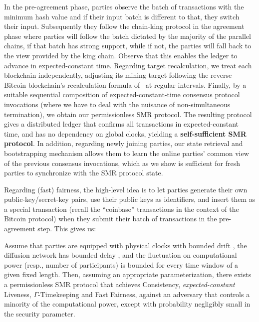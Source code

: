 In the pre-agreement phase, parties observe the batch of transactions with the minimum hash value and if their input batch is different to that, they switch their input.
%
Subsequently they follow the chain-king protocol in the agreement phase where parties will follow the batch dictated by the majority of the parallel chains, if that batch has strong support, while if not, the parties will fall back to the view provided by the king chain.
%
Observe that this enables the ledger to advance in expected-constant time.
%
Regarding target recalculation, we treat each blockchain independently, adjusting its mining target following the reverse Bitcoin blockchain's recalculation formula of~\cite{TCC:GarKiaShe22} at regular intervals.
%
Finally, by a suitable sequential composition of expected-constant-time consensus protocol invocations (where we have to deal with the nuisance of non-simultaneous termination), we obtain our permissionless SMR protocol.
%
The resulting protocol gives a distributed ledger that confirms all transactions in expected-constant time, and has no dependency on global clocks, yielding a \textbf{self-sufficient SMR protocol}.
%
In addition, regarding newly joining parties, our state retrieval and bootstrapping mechanism allows them to learn the online parties' common view of the previous consensus invocations, which as we show is sufficient for fresh parties to synchronize with the SMR protocol state.

Regarding (fast) fairness, the high-level idea is to let parties generate their own public-key/secret-key pairs, use their public keys as identifiers, and insert them as a special transaction (recall the ``coinbase'' transactions in the context of the Bitcoin protocol) when they submit their batch of transactions in the pre-agreement step.
%
This gives us:

\begin{theorem}[Informal] \label{thm:state-machine-replication}
    Assume that parties are equipped with physical clocks with bounded drift \clockDrift, the diffusion network has bounded delay \delay, and the fluctuation on computational power (resp., number of participants) is bounded for every time window of a given fixed length.
    Then, assuming an appropriate parameterization, there exists a permissionless SMR protocol that achieves Consistency, \emph{expected-constant} Liveness, $\varGamma$-Timekeeping and Fast Fairness, against an adversary that controls a minority of the computational power, except with probability negligibly small in the security parameter.
\end{theorem}


